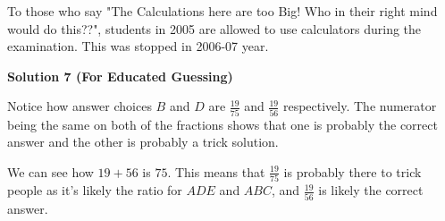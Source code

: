 \begin{enumerate}
 To those who say "The Calculations here are too Big! Who in their right mind would do this??", students in 2005 are allowed to use calculators during the examination. This was stopped in 2006-07 year.

 



\textbf{Solution 7 (For Educated Guessing)}

Notice how answer choices $B$ and $D$ are $\frac{19}{75}$ and $\frac{19}{56}$ respectively. The numerator being the same on both of the fractions shows that one is probably the correct answer and the other is probably a trick solution.

 We can see how $19+56$ is $75$. This means that $\frac{19}{75}$ is probably there to trick people as it's likely the ratio for $ADE$ and $ABC$, and $\boxed{\frac{19}{56}}$ is likely the correct answer.

 


\end{enumerate}